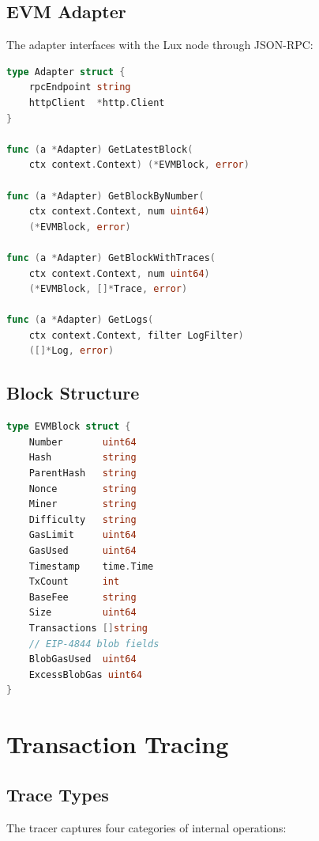 \documentclass[11pt,twocolumn]{article}
\begin{document}
\subsection{EVM Adapter}

The adapter interfaces with the Lux node through JSON-RPC:

\begin{lstlisting}[language=Go,caption={EVM adapter core methods}]
type Adapter struct {
    rpcEndpoint string
    httpClient  *http.Client
}

func (a *Adapter) GetLatestBlock(
    ctx context.Context) (*EVMBlock, error)

func (a *Adapter) GetBlockByNumber(
    ctx context.Context, num uint64)
    (*EVMBlock, error)

func (a *Adapter) GetBlockWithTraces(
    ctx context.Context, num uint64)
    (*EVMBlock, []*Trace, error)

func (a *Adapter) GetLogs(
    ctx context.Context, filter LogFilter)
    ([]*Log, error)
\end{lstlisting}

\subsection{Block Structure}

\begin{lstlisting}[language=Go,caption={EVM block representation}]
type EVMBlock struct {
    Number       uint64
    Hash         string
    ParentHash   string
    Nonce        string
    Miner        string
    Difficulty   string
    GasLimit     uint64
    GasUsed      uint64
    Timestamp    time.Time
    TxCount      int
    BaseFee      string
    Size         uint64
    Transactions []string
    // EIP-4844 blob fields
    BlobGasUsed  uint64
    ExcessBlobGas uint64
}
\end{lstlisting}

\section{Transaction Tracing}

\subsection{Trace Types}

The tracer captures four categories of internal operations:
\end{document}
